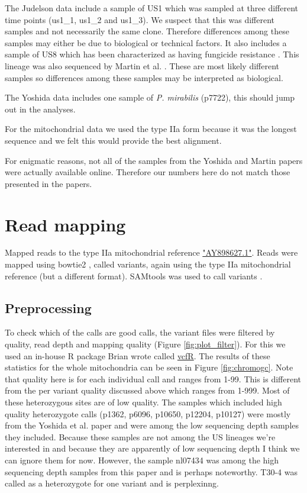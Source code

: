 \documentclass{article}\usepackage[]{graphicx}\usepackage[]{color}
\begin{document}
The Judelson data include a sample of US1 which was sampled at three different time points (us1\_1, us1\_2 and us1\_3).  We suspect that this was different samples and not necessarily the same clone.  Therefore differences among these samples may either be due to biological or technical factors.  It also includes a sample of US8 which has been characterized as having fungicide resistance \cite{danies2013phenotypic}.  This lineage was also sequenced by Martin et al. \cite{martin2013reconstructing}.  These are most likely different samples so differences among these samples may be interpreted as biological.

The Yoshida data includes one sample of \emph{P. mirabilis} (p7722), this should jump out in the analyses.

For the mitochondrial data we used the type IIa form \cite{avila2006mitochondrial} because it was the longest sequence and we felt this would provide the best alignment.

For enigmatic reasons, not all of the samples from the Yoshida and Martin papers were actually available online.  Therefore our numbers here do not match those presented in the papers.



\section{Read mapping}

Mapped reads to the type IIa mitochondrial reference \href{http://www.ncbi.nlm.nih.gov/nuccore/AY898627.1}{"AY898627.1"}.  Reads were mapped using bowtie2 \cite{langmead2012fast}, called variants, again using the type IIa mitochondrial reference (but a different format).  SAMtools was used to call variants \cite{li2009sequence}.

\subsection{Preprocessing}
To check which of the calls are good calls, the variant files were filtered by quality, read depth and mapping quality (Figure \ref{fig:plot_filter}). For this we used an in-house R package Brian wrote called \href{https://github.com/knausb/vcfR}{vcfR}. The results of these statistics for the whole mitochondria can be seen in Figure \ref{fig:chromogc}. Note that quality here is for each individual call and ranges from 1-99.  This is different from the per variant quality discussed above which ranges from 1-999.  Most of these heterozygous sites are of low quality.
The samples which included high quality heterozygote calls (p1362, p6096, p10650, p12204, p10127) were mostly from the Yoshida et al. \cite{yoshida2013correction} paper and were among the low sequencing depth samples they included.  Because these samples are not among the US lineages we're interested in and because they are apparently of low sequencing depth I think we can ignore them for now.  However, the sample nl07434 was among the high sequencing depth samples from this paper and is perhaps noteworthy.  T30-4 was called as a heterozygote for one variant and is perplexinng.
\end{document}
